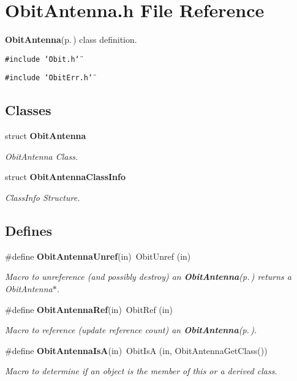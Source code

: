 \section{Obit\-Antenna.h File Reference}
\label{ObitAntenna_8h}
{\bf Obit\-Antenna}{\rm (p.\,\pageref{structObitAntenna})} class definition. 

{\tt \#include \char`\"{}Obit.h\char`\"{}}\par
{\tt \#include \char`\"{}Obit\-Err.h\char`\"{}}\par
\subsection*{Classes}
\begin{CompactItemize}
\item 
struct {\bf Obit\-Antenna}
\begin{CompactList}\small\item\em Obit\-Antenna Class. \item\end{CompactList}\item 
struct {\bf Obit\-Antenna\-Class\-Info}
\begin{CompactList}\small\item\em Class\-Info Structure. \item\end{CompactList}\end{CompactItemize}
\subsection*{Defines}
\begin{CompactItemize}
\item 
\#define {\bf Obit\-Antenna\-Unref}(in)\ Obit\-Unref (in)
\begin{CompactList}\small\item\em Macro to unreference (and possibly destroy) an {\bf Obit\-Antenna}{\rm (p.\,\pageref{structObitAntenna})} returns a Obit\-Antenna$\ast$. \item\end{CompactList}\item 
\#define {\bf Obit\-Antenna\-Ref}(in)\ Obit\-Ref (in)
\begin{CompactList}\small\item\em Macro to reference (update reference count) an {\bf Obit\-Antenna}{\rm (p.\,\pageref{structObitAntenna})}. \item\end{CompactList}\item 
\#define {\bf Obit\-Antenna\-Is\-A}(in)\ Obit\-Is\-A (in, Obit\-Antenna\-Get\-Class())
\begin{CompactList}\small\item\em Macro to determine if an object is the member of this or a derived class. \item\end{CompactList}\end{CompactItemize}
